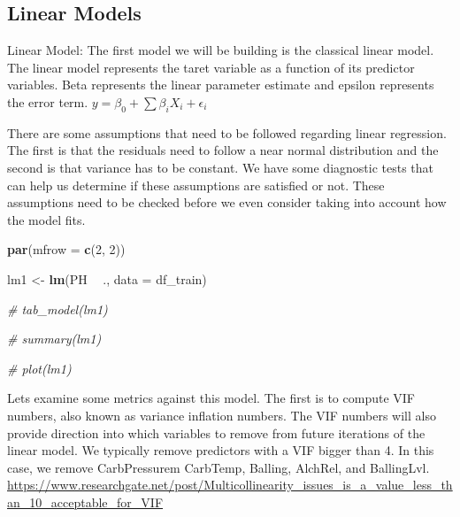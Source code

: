 \documentclass[]{report}
\newenvironment{Shaded}{\begin{snugshade}}{\end{snugshade}}
\newcommand{\CommentTok}[1]{\textcolor[rgb]{0.56,0.35,0.01}{\textit{#1}}}
\newcommand{\DataTypeTok}[1]{\textcolor[rgb]{0.13,0.29,0.53}{#1}}
\newcommand{\DecValTok}[1]{\textcolor[rgb]{0.00,0.00,0.81}{#1}}
\newcommand{\KeywordTok}[1]{\textcolor[rgb]{0.13,0.29,0.53}{\textbf{#1}}}
\newcommand{\NormalTok}[1]{#1}
\newcommand{\OperatorTok}[1]{\textcolor[rgb]{0.81,0.36,0.00}{\textbf{#1}}}
\newcommand{\StringTok}[1]{\textcolor[rgb]{0.31,0.60,0.02}{#1}}
\begin{document}
\hypertarget{linear-models}{%
\subsection{Linear Models}\label{linear-models}}

Linear Model: The first model we will be building is the classical
linear model. The linear model represents the taret variable as a
function of its predictor variables. Beta represents the linear
parameter estimate and epsilon represents the error term.
\(y={ \beta }_{ 0 }+\sum { { \beta }_{ i }{ X }_{ i }+{ \epsilon }_{ i } }\)

There are some assumptions that need to be followed regarding linear
regression. The first is that the residuals need to follow a near normal
distribution and the second is that variance has to be constant. We have
some diagnostic tests that can help us determine if these assumptions
are satisfied or not. These assumptions need to be checked before we
even consider taking into account how the model fits.

\begin{Shaded}
\begin{Highlighting}[]
\KeywordTok{par}\NormalTok{(}\DataTypeTok{mfrow =} \KeywordTok{c}\NormalTok{(}\DecValTok{2}\NormalTok{, }\DecValTok{2}\NormalTok{))}

\NormalTok{lm1 <-}\StringTok{ }\KeywordTok{lm}\NormalTok{(PH }\OperatorTok{~}\StringTok{ }\NormalTok{., }\DataTypeTok{data =}\NormalTok{ df_train)}

\CommentTok{# tab_model(lm1)}

\CommentTok{# summary(lm1)}

\CommentTok{# plot(lm1)}
\end{Highlighting}
\end{Shaded}

Lets examine some metrics against this model. The first is to compute
VIF numbers, also known as variance inflation numbers. The VIF numbers
will also provide direction into which variables to remove from future
iterations of the linear model. We typically remove predictors with a
VIF bigger than 4. In this case, we remove CarbPressurem CarbTemp,
Balling, AlchRel, and BallingLvl.
\url{https://www.researchgate.net/post/Multicollinearity_issues_is_a_value_less_than_10_acceptable_for_VIF}

\begin{Shaded}
\end{Shaded}
\end{document}
